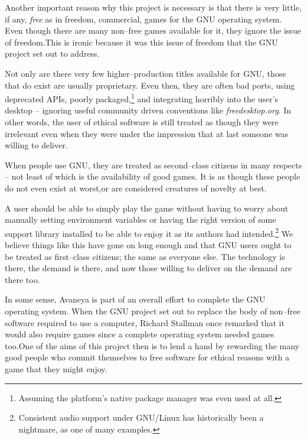 Another important reason why this project is necessary is that there is very little, if any, {\it free} as in freedom, commercial, games for the GNU operating system. Even though there are many non--free games available for it, they ignore the issue of freedom. This is ironic because it was this issue of freedom that the GNU project set out to address.

Not only are there very few higher--production titles available for GNU, those that do exist are usually proprietary. Even then, they are often bad ports, using deprecated APIs, poorly packaged,\footnote{Assuming the platform's native package manager was even used at all.} and integrating horribly into the user's desktop -- ignoring useful community driven conventions like {\it freedesktop.org}. In other words, the user of ethical software is still treated as though they were irrelevant even when they were under the impression that at last someone was willing to deliver.

When people use GNU, they are treated as second--class citizens in many respects -- not least of which is the availability of good games. It is as though these people do not even exist at worst, or are considered creatures of novelty at best. 

A user should be able to simply play the game without having to worry about manually setting environment variables or having the right version of some support library installed to be able to enjoy it as its authors had intended.\footnote{Consistent audio support under GNU/Linux has historically been a nightmare, as one of many examples.} We believe things like this have gone on long enough and that GNU users ought to be treated as first--class citizens; the same as everyone else. The technology is there, the demand is there, and now those willing to deliver on the demand are there too.

In some sense, Avaneya is part of an overall effort to complete the GNU operating system. When the GNU project set out to replace the body of non--free software required to use a computer, Richard Stallman once remarked that it would also require games since a complete operating system needed games too. One of the aims of this project then is to lend a hand by rewarding the many good people who commit themselves to free software for ethical reasons with a game that they might enjoy.

